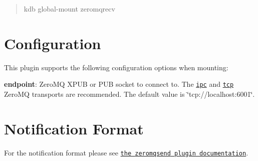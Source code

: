 \begin{quote}
kdb global-\/mount zeromqrecv \end{quote}
\hypertarget{autotoc_md940_autotoc_md944}{}\section{Configuration}\label{autotoc_md940_autotoc_md944}
This plugin supports the following configuration options when mounting\+:


\begin{DoxyItemize}
\item {\bfseries endpoint}\+: Zero\+MQ X\+P\+UB or P\+UB socket to connect to. The \href{http://api.zeromq.org/4-2:zmq-ipc}{\tt {\ttfamily ipc}} and \href{http://api.zeromq.org/4-2:zmq-tcp}{\tt {\ttfamily tcp}} Zero\+MQ transports are recommended. The default value is \char`\"{}tcp\+://localhost\+:6001\char`\"{}.
\end{DoxyItemize}\hypertarget{autotoc_md940_autotoc_md945}{}\section{Notification Format}\label{autotoc_md940_autotoc_md945}
For the notification format please see \href{https://www.libelektra.org/plugins/zeromqsend#notification-format}{\tt the {\ttfamily zeromqsend} plugin documentation}. 